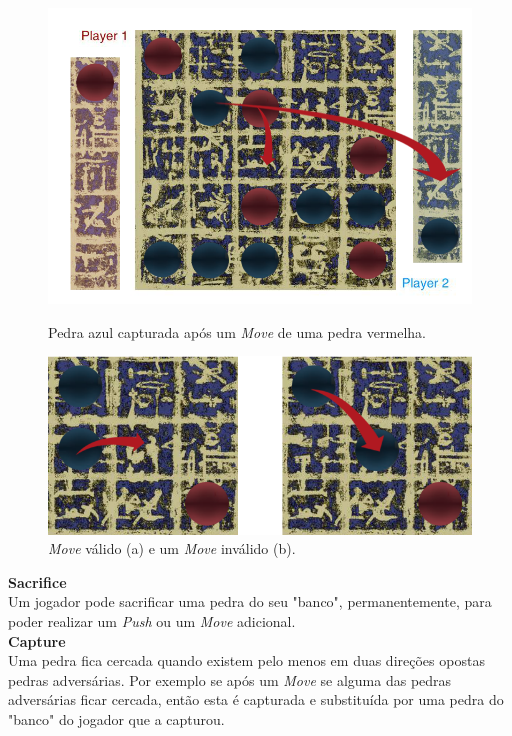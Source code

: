 \documentclass[a4paper]{article}
\begin{document}
\begin{figure}[!htb]
	\centering
  	\includegraphics[scale=0.3]{images/move_cap.png} 
	\caption{Pedra azul capturada após um \textit{Move} de uma pedra vermelha.}
\endminipage\hfill
{}
	\vspace*{3.1cm}
	\centering
	\includegraphics[scale=0.2]{images/valid_invalid_move.png} \vspace*{0.3cm}
	\caption{\textit{Move} válido (a) e um \textit{Move} inválido (b).}
\endminipage
\end{figure}

\textbf{Sacrifice}\\

Um jogador pode sacrificar uma pedra do seu "banco", permanentemente, para poder realizar um \textit{Push} ou um \textit{Move} adicional.\\


\textbf{Capture}\\

Uma pedra fica cercada quando existem pelo menos em duas direções opostas pedras adversárias. Por exemplo se após um \textit{Move} se alguma das pedras adversárias ficar cercada, então esta é capturada e substituída por uma pedra do "banco" do jogador que a capturou.
\end{document}
